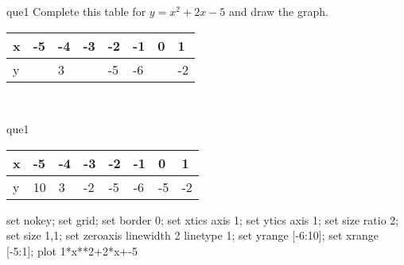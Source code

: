 \documentclass[13.5pt, varwidth=true]{beamer}
\begin{document}
\begin{frame}[shrink=19,fragile]
	\begin{beamercolorbox}[rounded=true, left, shadow=true,wd=14.8cm]{que1}
		 Complete this table for $y = x^{2} + 2x - 5$ and draw the graph. \\[0.3cm] \renewcommand{\arraystretch}{1.2}\begin{tabular}{|C|C|C|C|C|C|C|C|} \hline x & -5 & -4 & -3 & -2 & -1 & 0 & 1 \\ \hline y &  & 3 &  & -5 & -6 &  & -2\\ \hline \end{tabular}\\[0.3cm]
	\end{beamercolorbox}
\end{frame}
\begin{frame}[shrink=19,fragile]
	\begin{beamercolorbox}[rounded=true, left, shadow=true,wd=14.8cm]{que1}
		\renewcommand{\arraystretch}{1.2}\begin{tabular}{|C|C|C|C|C|C|C|C|} \hline x & -5 & -4 & -3 & -2 & -1 & 0 & 1 \\ \hline y & 10 & 3 & -2 & -5 & -6 & -5 & -2\\ \hline \end{tabular}\begin{gnuplot}[terminal=pdf] set nokey; set grid; set border 0; set xtics axis 1; set ytics axis 1; set size ratio 2; set size 1,1; set zeroaxis linewidth 2 linetype 1; set yrange [-6:10]; set xrange [-5:1]; plot 1*x**2+2*x+-5 \end{gnuplot}
	\end{beamercolorbox}
\end{frame}
\end{document}
